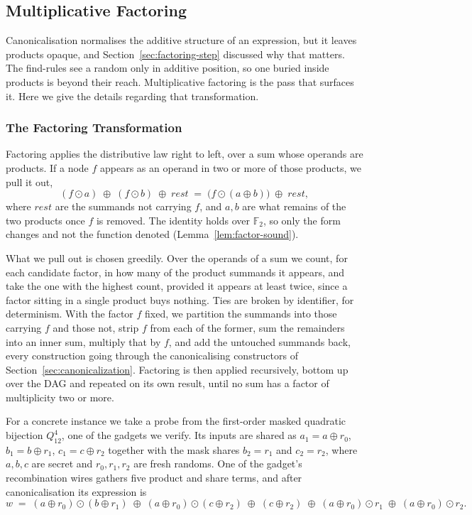   \subsection{Multiplicative Factoring}
  \label{sec:factoring}

  Canonicalisation normalises the additive structure of an expression, but it
  leaves products opaque, and Section~\ref{sec:factoring-step} discussed why that
  matters. The find-rules see a random only in additive position, so one buried
  inside products is beyond their reach. Multiplicative factoring is the pass that
  surfaces it. Here we give the details regarding that transformation.

    \subsubsection{The Factoring Transformation}
    \label{sec:factoring-transformation}

    Factoring applies the distributive law right to left, over a sum whose
    operands are products. If a node $f$ appears as an operand in two or more of
    those products, we pull it out,
    \[
      (f \odot a) \;\oplus\; (f \odot b) \;\oplus\; \mathit{rest}
      \;=\;
      \big(f \odot (a \oplus b)\big) \;\oplus\; \mathit{rest},
    \]
    where $\mathit{rest}$ are the summands not carrying $f$, and $a, b$ are what
    remains of the two products once $f$ is removed. The identity holds over
    $\mathbb{F}_2$, so only the form changes and not the function denoted
    (Lemma~\ref{lem:factor-sound}).

    What we pull out is chosen greedily. Over the operands of a sum we count, for
    each candidate factor, in how many of the product summands it appears, and take
    the one with the highest count, provided it appears at least twice, since a
    factor sitting in a single product buys nothing. Ties are broken by identifier,
    for determinism. With the factor $f$ fixed, we partition the summands into
    those carrying $f$ and those not, strip $f$ from each of the former, sum the
    remainders into an inner sum, multiply that by $f$, and add the untouched
    summands back, every construction going through the canonicalising
    constructors of Section~\ref{sec:canonicalization}. Factoring is then applied
    recursively, bottom up over the DAG and repeated on its own result, until no
    sum has a factor of multiplicity two or more.

    For a concrete instance we take a probe from the first-order masked quadratic
    bijection $Q^{4}_{12}$, one of the gadgets we verify. Its inputs are shared as
    $a_1 = a \oplus r_0$, $b_1 = b \oplus r_1$, $c_1 = c \oplus r_2$ together with
    the mask shares $b_2 = r_1$ and $c_2 = r_2$, where $a, b, c$ are secret and
    $r_0, r_1, r_2$ are fresh randoms. One of the gadget's recombination wires
    gathers five product and share terms, and after canonicalisation its expression is
    \[
      w \;=\; (a \oplus r_0)\odot(b \oplus r_1) \;\oplus\; (a \oplus r_0)\odot(c \oplus r_2)
          \;\oplus\; (c \oplus r_2) \;\oplus\; (a \oplus r_0)\odot r_1
          \;\oplus\; (a \oplus r_0)\odot r_2 .
    \]

